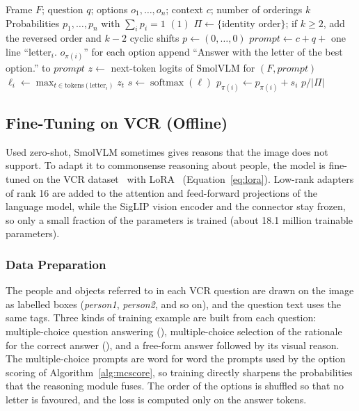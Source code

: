 \begin{algorithm}[H]
\caption{Debiased Multiple-Choice Scoring}
\label{alg:mcscore}
\begin{algorithmic}[1]
\Require Frame $F$; question $q$; options $o_1,\dots,o_n$; context $c$; number of orderings $k$
\Ensure Probabilities $p_1,\dots,p_n$ with $\sum_i p_i = 1$
  \State \Return $(1)$
\EndIf
\State $\Pi \gets \{\text{identity order}\}$; if $k \geq 2$, add the reversed order and $k-2$ cyclic shifts
\State $p \gets (0,\dots,0)$
  \State $\mathit{prompt} \gets c + q +$ one line ``letter$_i$. $o_{\pi(i)}$'' for each option
  \State append ``Answer with the letter of the best option.'' to $\mathit{prompt}$
  \State $z \gets$ next-token logits of SmolVLM for $(F, \mathit{prompt})$
    \State $\ell_i \gets \max_{t \in \text{tokens}(\text{letter}_i)} z_t$
  \EndFor
  \State $s \gets \operatorname{softmax}(\ell)$
    \State $p_{\pi(i)} \gets p_{\pi(i)} + s_i$ 
  \EndFor
\EndFor
\State \Return $p / |\Pi|$
\end{algorithmic}
\end{algorithm}

\subsection{Fine-Tuning on VCR (Offline)}
\label{sec:finetune}

Used zero-shot, SmolVLM sometimes gives reasons that the image does not support. To adapt it to commonsense reasoning about people, the model is fine-tuned on the VCR dataset~\cite{zellers2019vcr} with LoRA~\cite{hu2022lora} (Equation~\ref{eq:lora}). Low-rank adapters of rank 16 are added to the attention and feed-forward projections of the language model, while the SigLIP vision encoder and the connector stay frozen, so only a small fraction of the parameters is trained (about 18.1 million trainable parameters).

\subsubsection{Data Preparation}
The people and objects referred to in each VCR question are drawn on the image as labelled boxes (\emph{person1}, \emph{person2}, and so on), and the question text uses the same tags. Three kinds of training example are built from each question: multiple-choice question answering (\QtoA), multiple-choice selection of the rationale for the correct answer (\QAtoR), and a free-form answer followed by its visual reason. The multiple-choice prompts are word for word the prompts used by the option scoring of Algorithm~\ref{alg:mcscore}, so training directly sharpens the probabilities that the reasoning module fuses. The order of the options is shuffled so that no letter is favoured, and the loss is computed only on the answer tokens.

